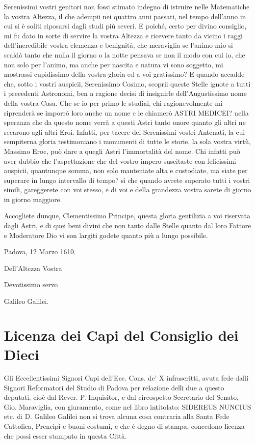 \documentclass[11pt,twoside,openany]{book}
\begin{document}
Serenissimi vostri genitori non fossi stimato indegno di istruire nelle Matematiche la vostra Altezza, il che adempii nei quattro anni passati, nel tempo dell'anno in cui si è soliti riposarsi dagli studi più severi. E poiché, certo per divino consiglio, mi fu dato in sorte di servire la vostra Altezza e ricevere tanto da vicino i raggi dell'incredibile vostra clemenza e benignità, che meraviglia se l'animo mio si scaldò tanto che nulla il giorno o la notte pensava se non il modo con cui io, che non solo per l'animo, ma anche per nascita e natura vi sono soggetto, mi mostrassi cupidissimo della vostra gloria ed a voi gratissimo? E quando accadde che, sotto i vostri auspicii, Serenissimo Cosimo, scoprii queste Stelle ignote a tutti i precedenti Astronomi, ben a ragione decisi di insignirle dell'Augustissimo nome della vostra Casa. Che se io per primo le studiai, chi ragionevolmente mi riprenderà se imporrò loro anche un nome e le chiamerò ASTRI MEDICEI? nella speranza che da questo nome verrà a questi Astri tanto onore quanto gli altri ne recarono agli altri Eroi. Infatti, per tacere dei Serenissimi vostri Antenati, la cui sempiterna gloria testimoniano i monumenti di tutte le storie, la sola vostra virtù, Massimo Eroe, può dare a quegli Astri l'immortalità del nome. Chi infatti può aver dubbio che l'aspettazione che del vostro impero suscitaste con felicissimi auspicii, quantunque somma, non solo manteniate alta e custodiate, ma siate per superare in lungo intervallo di tempo? sì che quando avrete superato tutti i vostri simili, gareggerete con voi stesso, e di voi e della grandezza vostra sarete di giorno in giorno maggiore.

Accogliete dunque, Clementissimo Principe, questa gloria gentilizia a voi riservata dagli Astri, e di quei beni divini che non tanto dalle Stelle quanto dal loro Fattore e Moderatore Dio vi son largiti godete quanto più a lungo possibile.

Padova, 12 Marzo 1610.

Dell'Altezza Vostra

Devotissimo servo

Galileo Galilei.

\chapter*{Licenza dei Capi del Consiglio dei Dieci}

Gli Eccellentissimi Signori Capi dell'Ecc. Cons. de' X infrascritti, avuta fede dalli Signori Reformatori del Studio di Padova per relazione delli due a questo deputati, cioè dal Rever. P. Inquisitor, e dal circospetto Secretario del Senato, Gio. Maraviglia, con giuramento, come nel libro intitolato: SIDEREUS NUNCIUS etc. di D. Galileo Galilei non si trova alcuna cosa contraria alla Santa Fede Cattolica, Prencipi e buoni costumi, e che è degno di stampa, concedono licenza che possi esser stampato in questa Città.
\end{document}
